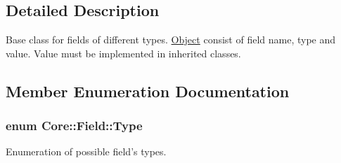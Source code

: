 \subsection{Detailed Description}
Base class for fields of different types. \hyperlink{classCore_1_1Object}{Object} consist of field name, type and value. Value must be implemented in inherited classes. 

\subsection{Member Enumeration Documentation}
\hypertarget{classCore_1_1Field_abd8b92d37ab4c79a2a15ec647c38cc9f}{
\subsubsection[{Type}]{\setlength{\rightskip}{0pt plus 5cm}enum {\bf Core::Field::Type}}}
\label{dc/d16/classCore_1_1Field_abd8b92d37ab4c79a2a15ec647c38cc9f}


Enumeration of possible field's types. 

